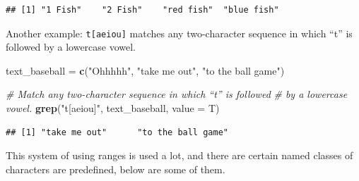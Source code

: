 \documentclass[
]{book}
\newenvironment{Shaded}{\begin{snugshade}}{\end{snugshade}}
\newcommand{\CommentTok}[1]{\textcolor[rgb]{0.56,0.35,0.01}{\textit{#1}}}
\newcommand{\DataTypeTok}[1]{\textcolor[rgb]{0.13,0.29,0.53}{#1}}
\newcommand{\KeywordTok}[1]{\textcolor[rgb]{0.13,0.29,0.53}{\textbf{#1}}}
\newcommand{\NormalTok}[1]{#1}
\newcommand{\StringTok}[1]{\textcolor[rgb]{0.31,0.60,0.02}{#1}}
\begin{document}
\begin{verbatim}
## [1] "1 Fish"    "2 Fish"    "red fish"  "blue fish"
\end{verbatim}

Another example: \texttt{t{[}aeiou{]}} matches any two-character sequence in which ``t'' is followed by a lowercase vowel.

\begin{Shaded}
\begin{Highlighting}[]
\NormalTok{text_baseball =}\StringTok{ }\KeywordTok{c}\NormalTok{(}\StringTok{"Ohhhhh"}\NormalTok{, }\StringTok{"take me out"}\NormalTok{, }\StringTok{"to the ball game"}\NormalTok{)}

\CommentTok{# Match any two-character sequence in which “t” is followed}
\CommentTok{# by a lowercase vowel.}
\KeywordTok{grep}\NormalTok{(}\StringTok{"t[aeiou]"}\NormalTok{, text_baseball, }\DataTypeTok{value =}\NormalTok{ T)}
\end{Highlighting}
\end{Shaded}

\begin{verbatim}
## [1] "take me out"      "to the ball game"
\end{verbatim}

This system of using ranges is used a lot, and there are certain named classes of characters are predefined, below are some of them.
\end{document}
